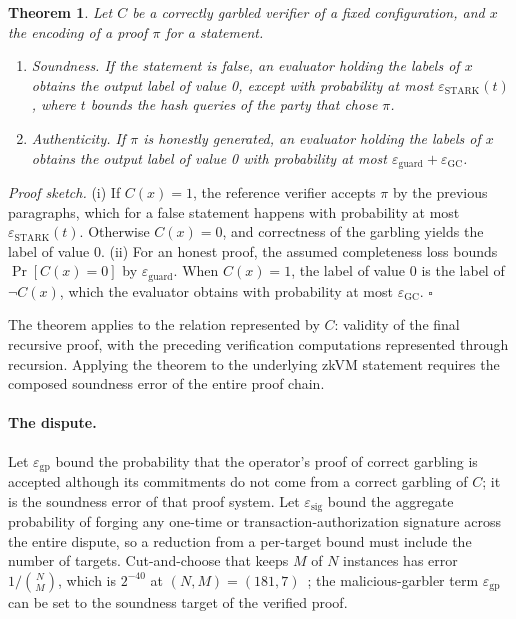 \documentclass[11pt]{article}
\newtheorem{theorem}{Theorem}
\begin{document}
\begin{theorem}\label{thm:main}
Let $C$ be a correctly garbled verifier of a fixed configuration, and $x$ the
encoding of a proof $\pi$ for a statement.
\begin{enumerate}
  \item[(i)] \emph{Soundness.} If the statement is false, an evaluator holding the
    labels of $x$ obtains the output label of value 0, except with probability at
    most $\varepsilon_{\mathrm{STARK}}(t)$, where $t$ bounds the hash queries of
    the party that chose $\pi$.
  \item[(ii)] \emph{Authenticity.} If $\pi$ is honestly generated, an evaluator
    holding the labels of $x$ obtains the output label of value 0 with probability
    at most $\varepsilon_{\mathrm{guard}}+\varepsilon_{\mathrm{GC}}$.
\end{enumerate}
\end{theorem}

\noindent\emph{Proof sketch.} (i) If $C(x)=1$, the reference verifier accepts $\pi$ by
the previous paragraphs, which for a false statement happens with probability at
most $\varepsilon_{\mathrm{STARK}}(t)$. Otherwise $C(x)=0$, and correctness of the
garbling yields the label of value 0. (ii) For an honest proof, the assumed
completeness loss bounds $\Pr[C(x)=0]$ by $\varepsilon_{\mathrm{guard}}$.
When $C(x)=1$, the label of value 0 is the label of $\neg C(x)$,
which the evaluator obtains with probability at most
$\varepsilon_{\mathrm{GC}}$. \hfill$\square$

\smallskip\noindent The theorem applies to the relation represented by $C$:
validity of the final recursive proof, with the preceding verification
computations represented through recursion. Applying the theorem to the
underlying zkVM statement requires the composed soundness error of the entire
proof chain.

\paragraph{The dispute.} Let $\varepsilon_{\mathrm{gp}}$ bound the probability
that the operator's proof of correct garbling is accepted although its
commitments do not come from a correct garbling of $C$; it is the soundness
error of that proof system. Let $\varepsilon_{\mathrm{sig}}$ bound the
aggregate probability of forging any one-time or transaction-authorization
signature across the entire dispute, so a reduction from a per-target bound
must include the number of targets. Cut-and-choose that keeps $M$ of $N$ instances has error
$1/\binom{N}{M}$, which is $2^{-40}$ at $(N,M)=(181,7)$~\cite{babe2026}; the
malicious-garbler term $\varepsilon_{\mathrm{gp}}$ can be set to the
soundness target of the verified proof.
\end{document}
